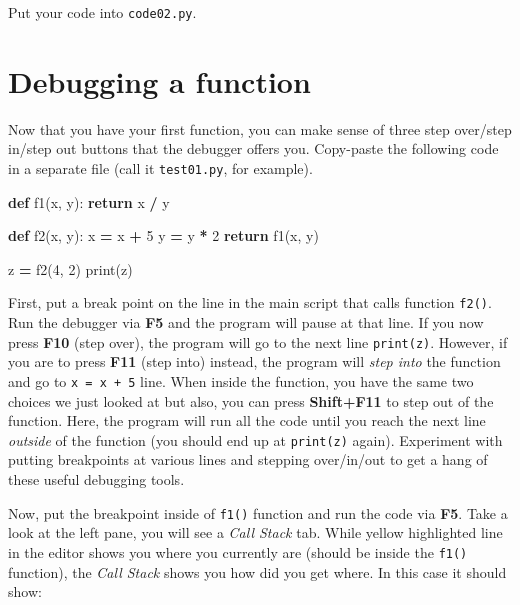 \documentclass[
]{book}
\newenvironment{Shaded}{\begin{snugshade}}{\end{snugshade}}
\newcommand{\BuiltInTok}[1]{#1}
\newcommand{\ControlFlowTok}[1]{\textcolor[rgb]{0.13,0.29,0.53}{\textbf{#1}}}
\newcommand{\DecValTok}[1]{\textcolor[rgb]{0.00,0.00,0.81}{#1}}
\newcommand{\KeywordTok}[1]{\textcolor[rgb]{0.13,0.29,0.53}{\textbf{#1}}}
\newcommand{\NormalTok}[1]{#1}
\newcommand{\OperatorTok}[1]{\textcolor[rgb]{0.81,0.36,0.00}{\textbf{#1}}}
\begin{document}
Put your code into \texttt{code02.py}.

\hypertarget{debugging-a-function}{%
\section{Debugging a function}\label{debugging-a-function}}

Now that you have your first function, you can make sense of three step over/step in/step out buttons that the debugger offers you. Copy-paste the following code in a separate file (call it \texttt{test01.py}, for example).

\begin{Shaded}
\begin{Highlighting}[]
\KeywordTok{def}\NormalTok{ f1(x, y):}
  \ControlFlowTok{return}\NormalTok{ x }\OperatorTok{/}\NormalTok{ y}
  
\KeywordTok{def}\NormalTok{ f2(x, y):}
\NormalTok{  x }\OperatorTok{=}\NormalTok{ x }\OperatorTok{+} \DecValTok{5}
\NormalTok{  y }\OperatorTok{=}\NormalTok{ y }\OperatorTok{*} \DecValTok{2}
  \ControlFlowTok{return}\NormalTok{ f1(x, y)}
  
\NormalTok{z }\OperatorTok{=}\NormalTok{ f2(}\DecValTok{4}\NormalTok{, }\DecValTok{2}\NormalTok{)}
\BuiltInTok{print}\NormalTok{(z)}
\end{Highlighting}
\end{Shaded}

First, put a break point on the line in the main script that calls function \texttt{f2()}. Run the debugger via \textbf{F5} and the program will pause at that line. If you now press \textbf{F10} (step over), the program will go to the next line \texttt{print(z)}. However, if you are to press \textbf{F11} (step into) instead, the program will \emph{step into} the function and go to \texttt{x\ =\ x\ +\ 5} line. When inside the function, you have the same two choices we just looked at but also, you can press \textbf{Shift+F11} to step out of the function. Here, the program will run all the code until you reach the next line \emph{outside} of the function (you should end up at \texttt{print(z)} again). Experiment with putting breakpoints at various lines and stepping over/in/out to get a hang of these useful debugging tools.

Now, put the breakpoint inside of \texttt{f1()} function and run the code via \textbf{F5}. Take a look at the left pane, you will see a \emph{Call Stack} tab. While yellow highlighted line in the editor shows you where you currently are (should be inside the \texttt{f1()} function), the \emph{Call Stack} shows you how did you get where. In this case it should show:
\end{document}

